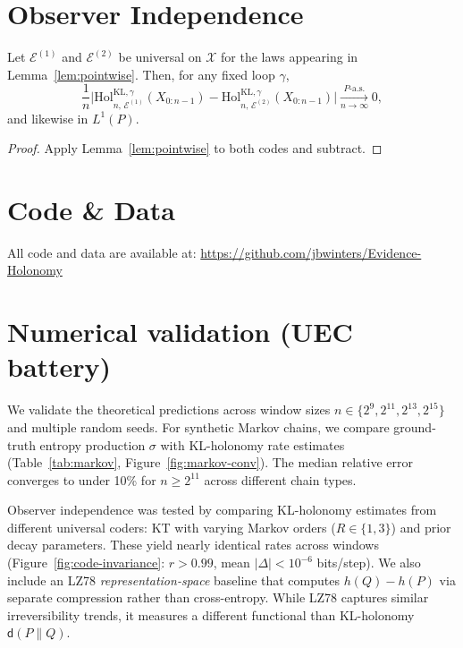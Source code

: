 \documentclass[11pt]{article}
\newcommand{\X}{\mathcal{X}}
\newcommand{\1}{\mathbbm{1}}
\newcommand{\code}{\mathcal{E}}
\begin{document}
\section{Observer Independence}

\begin{theorem}\label{thm:observer_ind}
Let $\code^{(1)}$ and $\code^{(2)}$ be universal on $\X$ for the laws appearing in Lemma~\ref{lem:pointwise}. Then, for any fixed loop $\gamma$,
\[
\frac{1}{n}\Big|\mathrm{Hol}_{n,\,\code^{(1)}}^{\mathrm{KL},\gamma}(X_{0:n-1}) - \mathrm{Hol}_{n,\,\code^{(2)}}^{\mathrm{KL},\gamma}(X_{0:n-1})\Big| \xrightarrow[n\to\infty]{P\text{-a.s.}} 0,
\]
and likewise in $L^1(P)$.
\end{theorem}
\begin{proof}
Apply Lemma~\ref{lem:pointwise} to both codes and subtract.
\end{proof}

\section{Code \& Data}

All code and data are available at: \url{https://github.com/jbwinters/Evidence-Holonomy}

\section{Numerical validation (UEC battery)}

We validate the theoretical predictions across window sizes $n \in \{2^9, 2^{11}, 2^{13}, 2^{15}\}$ and multiple random seeds. For synthetic Markov chains, we compare ground-truth entropy production $\sigma$ with KL-holonomy rate estimates (Table~\ref{tab:markov}, Figure~\ref{fig:markov-conv}). The median relative error converges to under 10\% for $n \geq 2^{11}$ across different chain types.

Observer independence was tested by comparing KL-holonomy estimates from
different universal coders: KT with varying Markov orders ($R \in \{1,3\}$) and 
prior decay parameters. These yield nearly identical rates across windows 
(Figure~\ref{fig:code-invariance}: $r > 0.99$, mean $|\Delta| < 10^{-6}$ bits/step).
We also include an LZ78 \emph{representation-space} baseline that computes 
$h(Q)-h(P)$ via separate compression rather than cross-entropy. While LZ78 
captures similar irreversibility trends, it measures a different functional 
than KL-holonomy $\mathsf{d}(P\|Q)$.
\end{document}
